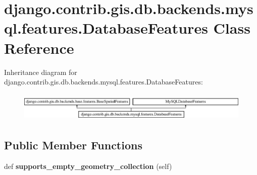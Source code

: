 \hypertarget{classdjango_1_1contrib_1_1gis_1_1db_1_1backends_1_1mysql_1_1features_1_1_database_features}{}\section{django.\+contrib.\+gis.\+db.\+backends.\+mysql.\+features.\+Database\+Features Class Reference}
\label{classdjango_1_1contrib_1_1gis_1_1db_1_1backends_1_1mysql_1_1features_1_1_database_features}
Inheritance diagram for django.\+contrib.\+gis.\+db.\+backends.\+mysql.\+features.\+Database\+Features\+:\begin{figure}[H]
\begin{center}
\leavevmode
\includegraphics[height=1.407035cm]{classdjango_1_1contrib_1_1gis_1_1db_1_1backends_1_1mysql_1_1features_1_1_database_features}
\end{center}
\end{figure}
\subsection*{Public Member Functions}
\begin{DoxyCompactItemize}
\item 
\mbox{\label{classdjango_1_1contrib_1_1gis_1_1db_1_1backends_1_1mysql_1_1features_1_1_database_features_af9663fa991edadcdbe28826ce63ca66e}} 
def {\bfseries supports\+\_\+empty\+\_\+geometry\+\_\+collection} (self)
\end{DoxyCompactItemize}
